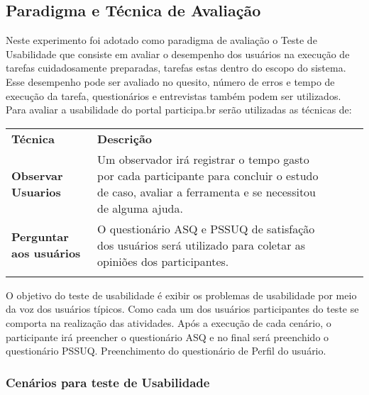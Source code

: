 \subsection{Paradigma e Técnica de Avaliação}

Neste experimento foi adotado como paradigma de avaliação o Teste de Usabilidade que consiste em avaliar o desempenho dos usuários na execução de tarefas cuidadosamente preparadas, tarefas estas dentro do escopo do sistema. Esse desempenho pode ser avaliado no quesito, número de erros e tempo de execução da tarefa, questionários e entrevistas também podem ser utilizados.
Para avaliar a usabilidade do portal participa.br serão utilizadas as técnicas de:


\begin{table}[h]
\begin{tabular}{lllll}
\cline{1-2}
\multicolumn{1}{|l|}{\textbf{Técnica}}                & \multicolumn{1}{l|}{\textbf{Descrição}}                                                                                                                                    &  &  &  \\ \cline{1-2}
\multicolumn{1}{|l|}{\textbf{Observar Usuarios}}      & \multicolumn{1}{l|}{Um observador irá registrar o tempo gasto por cada participante para concluir o estudo de caso, avaliar a ferramenta e se necessitou de alguma ajuda.} &  &  &  \\ \cline{1-2}
\multicolumn{1}{|l|}{\textbf{Perguntar aos usuários}} & \multicolumn{1}{l|}{O questionário ASQ e PSSUQ de satisfação dos usuários será utilizado para coletar as opiniões dos participantes.}                                      &  &  &  \\ \cline{1-2}
                                                      &                                                                                                                                                                            &  &  & 
\end{tabular}
\end{table}

O objetivo do teste de usabilidade é exibir os problemas de usabilidade por meio da voz dos usuários típicos. Como cada um dos usuários participantes do teste se comporta na realização das atividades.
	Após a execução de cada cenário, o participante irá preencher o questionário ASQ e no final será preenchido o questionário PSSUQ.
	Preenchimento do questionário de Perfil do usuário.

\subsubsection{Cenários para teste de Usabilidade}

